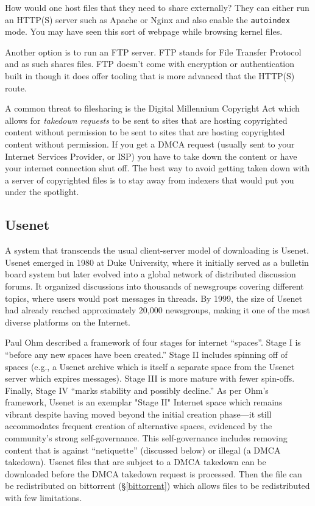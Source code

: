 How would one host files that they need to share externally? They can either run
an HTTP(S) server such as Apache or Nginx and also enable the \texttt{autoindex}
mode. You may have seen this sort of webpage while browsing kernel files.

Another option is to run an FTP server. FTP stands for File Transfer Protocol
and as such shares files. FTP doesn't come with encryption or authentication
built in though it does offer tooling that is more advanced that the HTTP(S)
route.

A common threat to filesharing is the Digital Millennium Copyright Act
\cite{DigitalMillenniumCopyright2025} which allows for \emph{takedown requests}
to be sent to sites that are hosting copyrighted content without permission to
be sent to sites that are hosting copyrighted content without permission. If you
get a DMCA request (usually sent to your Internet Services Provider, or ISP) you
have to take down the content or have your internet connection shut off. The
best way to avoid getting taken down with a server of copyrighted files is to
stay away from indexers that would put you under the spotlight.


\subsection{Usenet}\label{usenet}

A system that transcends the usual client-server model of downloading is Usenet.
Usenet emerged in 1980 at Duke University, where it initially served as a
bulletin board system but later evolved into a global network of distributed
discussion forums.\cite{HowUseUsenet} It organized discussions into thousands of
newsgroups covering different topics, where users would post messages in
threads. By 1999, the size of Usenet had already reached approximately 20,000
newsgroups, making it one of the most diverse platforms on the Internet.

Paul Ohm described a framework of four stages for internet ``spaces''. Stage I
is ``before any new spaces have been created.'' Stage II includes spinning off
of spaces (e.g., a Usenet archive which is itself a separate space from the
Usenet server which expires messages). Stage III is more mature with fewer
spin-offs. Finally, Stage IV ``marks stability and possibly decline.'' As per
Ohm's framework, Usenet is an exemplar "Stage II" Internet space which remains
vibrant despite having moved beyond the initial creation phase---it still
accommodates frequent creation of alternative spaces, evidenced by the
community's strong self-governance. This self-governance includes removing
content that is against ``netiquette'' (discussed below) or illegal (a DMCA
takedown). Usenet files that are subject to a DMCA takedown can be downloaded
before the DMCA takedown request is processed. Then the file can be
redistributed on bittorrent (\S \ref{bittorrent}) which allows files to be
redistributed with few limitations.

